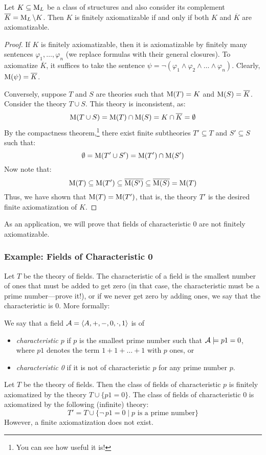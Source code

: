 \begin{theorem}\label{theorem:finite-axiomatizability}
    Let $K \subseteq \operatorname{M}_L$ be a class of structures and also consider its complement $\overline{K} = \operatorname{M}_L \setminus K$. Then $K$ is finitely axiomatizable if and only if both $K$ and $\overline{K}$ are axiomatizable.   
\end{theorem}
\begin{proof}
If $K$ is finitely axiomatizable, then it is axiomatizable by finitely many sentences $\varphi_1, \dots, \varphi_n$ (we replace formulas with their general closures). To axiomatize $\overline{K}$, it suffices to take the sentence $\psi = \neg(\varphi_1 \land \varphi_2 \land \dots \land \varphi_n)$. Clearly, $\operatorname{M}(\psi) = \overline{K}$.

Conversely, suppose $T$ and $S$ are theories such that $\operatorname{M}(T) = K$ and $\operatorname{M}(S) = \overline{K}$. Consider the theory $T \cup S$. This theory is inconsistent, as:
$$
\operatorname{M}(T \cup S) = \operatorname{M}(T) \cap \operatorname{M}(S) = K \cap \overline{K} = \emptyset
$$
By the compactness theorem,\footnote{You can see how useful it is!} there exist finite subtheories $T' \subseteq T$ and $S' \subseteq S$ such that:
$$
\emptyset = \operatorname{M}(T' \cup S') = \operatorname{M}(T') \cap \operatorname{M}(S')
$$
Now note that:
$$
\operatorname{M}(T) \subseteq \operatorname{M}(T') \subseteq \overline{\operatorname{M}(S')} \subseteq \overline{\operatorname{M}(S)} = \operatorname{M}(T)
$$
Thus, we have shown that $\operatorname{M}(T) = \operatorname{M}(T')$, that is, the theory $T'$ is the desired finite axiomatization of $K$.
\end{proof}

As an application, we will prove that fields of characteristic 0 are not finitely axiomatizable.

\subsubsection*{Example: Fields of Characteristic 0}
 
Let $T$ be the theory of fields. The characteristic of a field is the smallest number of ones that must be added to get zero (in that case, the characteristic must be a prime number---prove it!), or if we never get zero by adding ones, we say that the characteristic is 0. More formally:

\begin{definition}
We say that a field $\mathcal{A} = \langle A, +, -, 0, \cdot, 1 \rangle$ is of
\begin{itemize}
    \item \emph{characteristic $p$} if $p$ is the smallest prime number such that $\mathcal{A} \models p1 = 0$, where $p1$ denotes the term $1 + 1 + \dots + 1$ with $p$ ones, or
    \item \emph{characteristic 0} if it is not of characteristic $p$ for any prime number $p$.
\end{itemize}
\end{definition}
Let $T$ be the theory of fields. Then the class of fields of characteristic $p$ is finitely axiomatized by the theory $T \cup \{p1 = 0\}$. The class of fields of characteristic 0 is axiomatized by the following (infinite) theory:
$$
T' = T \cup \{\neg\, p1 = 0 \mid p \text{ is a prime number}\}
$$
However, a finite axiomatization does not exist.

